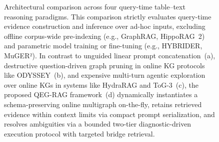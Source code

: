 \begin{figure}[t]
\centering
\resizebox{0.92\linewidth}{!}{}
\vspace{2.5mm}
\caption{Architectural comparison across four query-time table--text reasoning paradigms. This comparison strictly evaluates query-time evidence construction and inference over ad-hoc inputs, excluding offline corpus-wide pre-indexing (e.g., GraphRAG, HippoRAG~2) and parametric model training or fine-tuning (e.g., HYBRIDER, MuGER²). In contrast to unguided linear prompt concatenation~(a), destructive question-driven graph pruning in online KG protocols like ODYSSEY~(b), and expensive multi-turn agentic exploration over online KGs in systems like HydraRAG and ToG-3~(c), the proposed QEG-RAG framework~(d) dynamically instantiates a schema-preserving online multigraph on-the-fly, retains retrieved evidence within context limits via compact prompt serialization, and resolves ambiguities via a bounded two-tier diagnostic-driven execution protocol with targeted bridge retrieval.}
\vspace{-2mm}
\label{fig:paradigms}
\end{figure}
